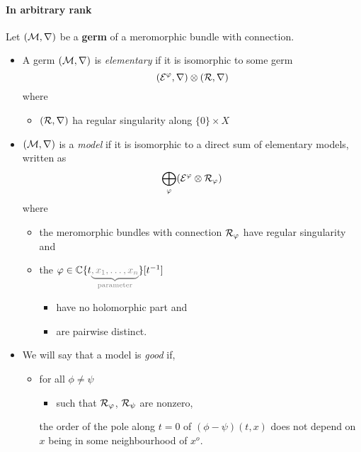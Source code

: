 \paragraph{In arbitrary rank}
\begin{defn}
  Let $(\mathcal{M},\nabla)$ be a \textbf{germ} of a meromorphic bundle with
  connection.
  \begin{itemize}
    \item A germ $(\mathcal{M},\nabla)$ is \emph{elementary} if it is isomorphic to
      some germ
      \[
        (\mathcal{E}^\varphi,\nabla)\otimes(\mathcal{R},\nabla)
      \]
      where
      \begin{itemize}
        \item $(\mathcal{R},\nabla)$ ha regular singularity along $\{0\}\times X$
      \end{itemize}
    \item $(\mathcal{M},\nabla)$ is a \emph{model} if it is isomorphic to a direct sum
      of elementary models, written as
      \[
        \bigoplus_\varphi(\mathcal{E}^\varphi\otimes\mathcal{R}_\varphi)
      \]
      where
      \begin{itemize}
        \item the meromorphic bundles with connection $\mathcal{R}_\varphi$ have regular
          singularity and
        \item the
          $\phi\in\C\{t\textcolor{gray}{\underset{\text{parameter}}
            {\underbrace{,x_1,\ldots,x_n}}}\}[t^{-1}]$
          \begin{itemize}
            \item have no holomorphic part and
            \item are pairwise distinct.
          \end{itemize}
      \end{itemize}
    \item We will say that a model is \emph{good} if,
      \begin{itemize}
        \item for all $\phi\neq\psi$
          \begin{itemize}
            \item such that $\mathcal{R}_\varphi$, $\mathcal{R}_\psi$ are nonzero,
          \end{itemize}
          the order of the pole along $t=0$ of $(\phi-\psi)(t,x)$ does not
          depend on $x$ being in some neighbourhood of $x^o$.
      \end{itemize}
  \end{itemize}
\end{defn}
